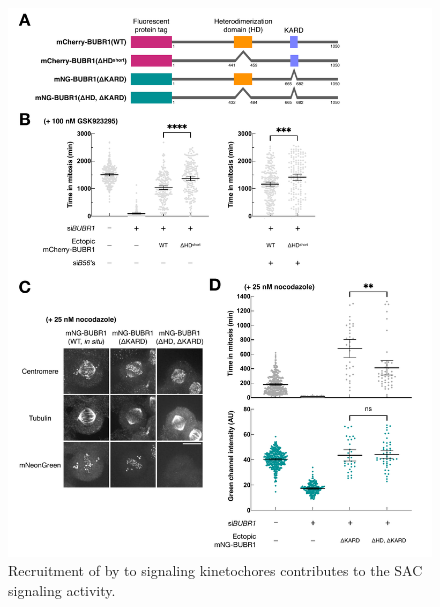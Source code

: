 \begin{figure}
    \centering
    \includegraphics[width=\textwidth]{chapters/figures/RescueExperiment.pdf}
    \caption{Recruitment of  by  to signaling kinetochores  contributes to the SAC signaling activity.}
    \label{RescueExperiment}
\end{figure}
